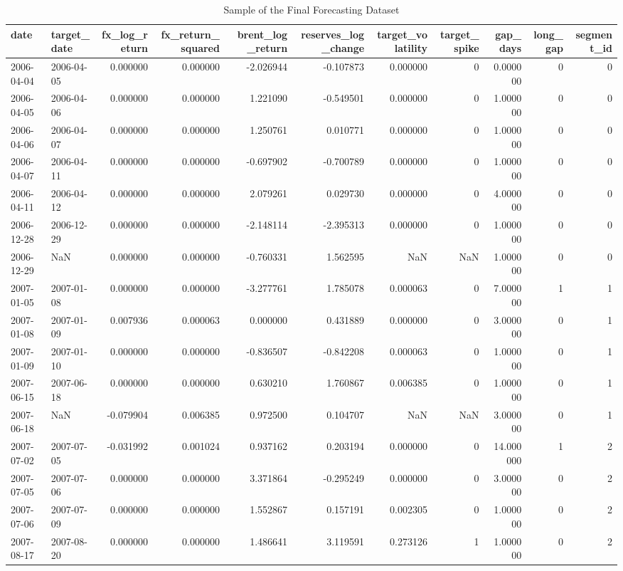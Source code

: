 \begin{table}
\caption{Sample of the Final Forecasting Dataset}
\label{tab:4.2}
\begin{tabular}{llrrrrrrrrr}
\toprule
date & target_date & fx_log_return & fx_return_squared & brent_log_return & reserves_log_change & target_volatility & target_spike & gap_days & long_gap & segment_id \\
\midrule
2006-04-04 & 2006-04-05 & 0.000000 & 0.000000 & -2.026944 & -0.107873 & 0.000000 & 0 & 0.000000 & 0 & 0 \\
2006-04-05 & 2006-04-06 & 0.000000 & 0.000000 & 1.221090 & -0.549501 & 0.000000 & 0 & 1.000000 & 0 & 0 \\
2006-04-06 & 2006-04-07 & 0.000000 & 0.000000 & 1.250761 & 0.010771 & 0.000000 & 0 & 1.000000 & 0 & 0 \\
2006-04-07 & 2006-04-11 & 0.000000 & 0.000000 & -0.697902 & -0.700789 & 0.000000 & 0 & 1.000000 & 0 & 0 \\
2006-04-11 & 2006-04-12 & 0.000000 & 0.000000 & 2.079261 & 0.029730 & 0.000000 & 0 & 4.000000 & 0 & 0 \\
2006-12-28 & 2006-12-29 & 0.000000 & 0.000000 & -2.148114 & -2.395313 & 0.000000 & 0 & 1.000000 & 0 & 0 \\
2006-12-29 & NaN & 0.000000 & 0.000000 & -0.760331 & 1.562595 & NaN & NaN & 1.000000 & 0 & 0 \\
2007-01-05 & 2007-01-08 & 0.000000 & 0.000000 & -3.277761 & 1.785078 & 0.000063 & 0 & 7.000000 & 1 & 1 \\
2007-01-08 & 2007-01-09 & 0.007936 & 0.000063 & 0.000000 & 0.431889 & 0.000000 & 0 & 3.000000 & 0 & 1 \\
2007-01-09 & 2007-01-10 & 0.000000 & 0.000000 & -0.836507 & -0.842208 & 0.000063 & 0 & 1.000000 & 0 & 1 \\
2007-06-15 & 2007-06-18 & 0.000000 & 0.000000 & 0.630210 & 1.760867 & 0.006385 & 0 & 1.000000 & 0 & 1 \\
2007-06-18 & NaN & -0.079904 & 0.006385 & 0.972500 & 0.104707 & NaN & NaN & 3.000000 & 0 & 1 \\
2007-07-02 & 2007-07-05 & -0.031992 & 0.001024 & 0.937162 & 0.203194 & 0.000000 & 0 & 14.000000 & 1 & 2 \\
2007-07-05 & 2007-07-06 & 0.000000 & 0.000000 & 3.371864 & -0.295249 & 0.000000 & 0 & 3.000000 & 0 & 2 \\
2007-07-06 & 2007-07-09 & 0.000000 & 0.000000 & 1.552867 & 0.157191 & 0.002305 & 0 & 1.000000 & 0 & 2 \\
2007-08-17 & 2007-08-20 & 0.000000 & 0.000000 & 1.486641 & 3.119591 & 0.273126 & 1 & 1.000000 & 0 & 2 \\

\end{tabular}
\end{table}
